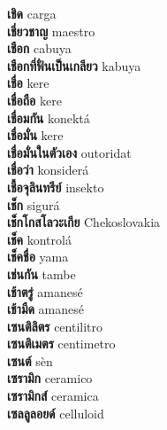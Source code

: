 \textbf{ เชิด  } carga \\
\textbf{ เชี่ยวชาญ  } maestro \\
\textbf{ เชือก  } cabuya \\
\textbf{ เชือกที่ฟั่นเป็นเกลียว  } kabuya \\
\textbf{ เชื่อ  } kere \\
\textbf{ เชื่อถือ  } kere \\
\textbf{ เชื่อมกัน  } konektá \\
\textbf{ เชื่อมั่น  } kere \\
\textbf{ เชื่อมั่นในตัวเอง  } outoridat \\
\textbf{ เชื่อว่า  } konsiderá \\
\textbf{ เชื้อจุลินทรีย์  } insekto \\
\textbf{ เช็ก  } sigurá \\
\textbf{ เช็กโกสโลวะเกีย  } Chekoslovakia \\
\textbf{ เช็ค  } kontrolá \\
\textbf{ เช็คชื่อ  } yama \\
\textbf{ เช่นกัน  } tambe \\
\textbf{ เช้าตรู่  } amanesé \\
\textbf{ เช้ามืด  } amanesé \\
\textbf{ เซนติลิตร  } centilitro \\
\textbf{ เซนติเมตร  } centimetro \\
\textbf{ เซนต์  } sèn \\
\textbf{ เซรามิก  } ceramico \\
\textbf{ เซรามิกส์  } ceramica \\
\textbf{ เซลลูลอยด์  } celluloid \\
